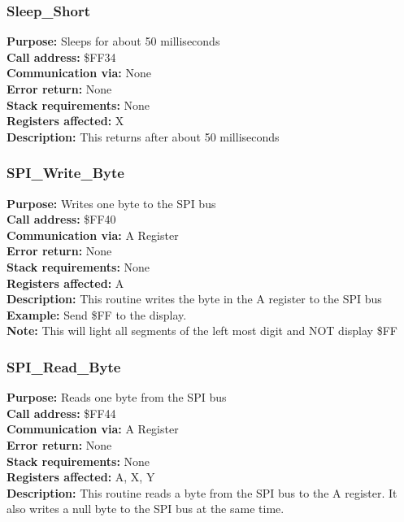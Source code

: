 \subsubsection{Sleep\_Short}
\textbf{Purpose:} Sleeps for about 50 milliseconds\\
\textbf{Call address:} \$FF34\\
\textbf{Communication via:} None\\
\textbf{Error return:} None\\
\textbf{Stack requirements:} None\\
\textbf{Registers affected:} X\\
\textbf{Description:} This returns after about 50 milliseconds\\


\subsubsection{SPI\_Write\_Byte}
\textbf{Purpose:} Writes one byte to the SPI bus\\
\textbf{Call address:} \$FF40\\
\textbf{Communication via:} A Register\\
\textbf{Error return:} None\\
\textbf{Stack requirements:} None\\
\textbf{Registers affected:} A\\
\textbf{Description:} This routine writes the byte in the A register to the SPI bus\\
\textbf{Example:} Send \$FF to the display.\\
\textbf{Note:} This will light all segments of the left most digit and NOT display \$FF\\


\subsubsection{SPI\_Read\_Byte}
\textbf{Purpose:} Reads one byte from the SPI bus\\
\textbf{Call address:} \$FF44\\
\textbf{Communication via:} A Register\\
\textbf{Error return:} None\\
\textbf{Stack requirements:} None\\
\textbf{Registers affected:} A, X, Y\\
\textbf{Description:} This routine reads a byte from the SPI bus to the A register. It also writes a null byte to the SPI bus at the same time.\\

